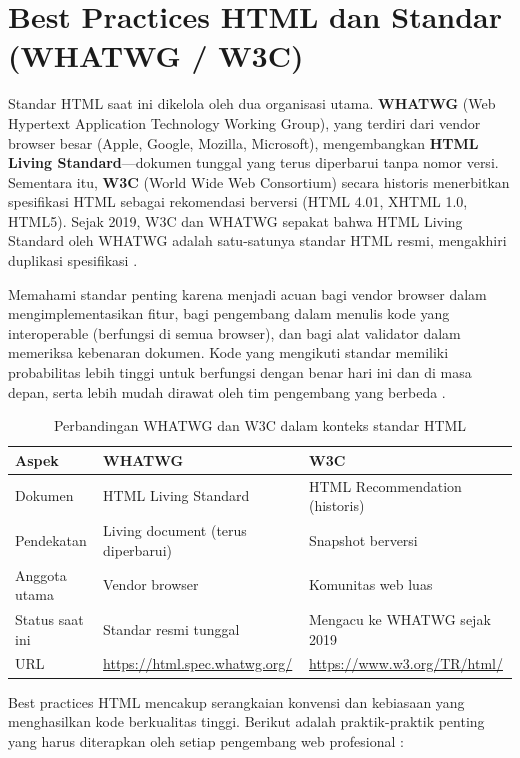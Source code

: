 \section{Best Practices HTML dan Standar (WHATWG / W3C)}

Standar HTML saat ini dikelola oleh dua organisasi utama. \textbf{WHATWG} (Web Hypertext Application Technology Working Group), yang terdiri dari vendor browser besar (Apple, Google, Mozilla, Microsoft), mengembangkan \textbf{HTML Living Standard}---dokumen tunggal yang terus diperbarui tanpa nomor versi. Sementara itu, \textbf{W3C} (World Wide Web Consortium) secara historis menerbitkan spesifikasi HTML sebagai rekomendasi berversi (HTML 4.01, XHTML 1.0, HTML5). Sejak 2019, W3C dan WHATWG sepakat bahwa HTML Living Standard oleh WHATWG adalah satu-satunya standar HTML resmi, mengakhiri duplikasi spesifikasi \cite{whatwgHtml}.

Memahami standar penting karena menjadi acuan bagi vendor browser dalam mengimplementasikan fitur, bagi pengembang dalam menulis kode yang interoperable (berfungsi di semua browser), dan bagi alat validator dalam memeriksa kebenaran dokumen. Kode yang mengikuti standar memiliki probabilitas lebih tinggi untuk berfungsi dengan benar hari ini dan di masa depan, serta lebih mudah dirawat oleh tim pengembang yang berbeda \cite{mdnHtmlIntro}.

\begin{table}[htbp]
\centering
\begin{tabular}{|P{3cm}|P{4.5cm}|P{4.5cm}|}
\hline
\textbf{Aspek} & \textbf{WHATWG} & \textbf{W3C} \\
\hline
Dokumen & HTML Living Standard & HTML Recommendation (historis) \\
\hline
Pendekatan & Living document (terus diperbarui) & Snapshot berversi \\
\hline
Anggota utama & Vendor browser & Komunitas web luas \\
\hline
Status saat ini & Standar resmi tunggal & Mengacu ke WHATWG sejak 2019 \\
\hline
URL & \url{https://html.spec.whatwg.org/} & \url{https://www.w3.org/TR/html/} \\
\hline
\end{tabular}
\caption{Perbandingan WHATWG dan W3C dalam konteks standar HTML}
\end{table}

Best practices HTML mencakup serangkaian konvensi dan kebiasaan yang menghasilkan kode berkualitas tinggi. Berikut adalah praktik-praktik penting yang harus diterapkan oleh setiap pengembang web profesional \cite{webdevHtml}:


